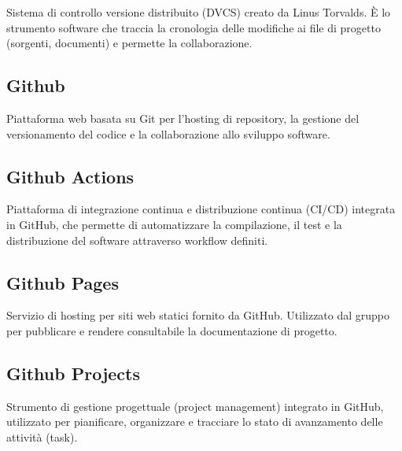 \documentclass[a4paper, 11pt, oneside]{scrartcl} %
\begin{document}

Sistema di controllo versione distribuito (DVCS) creato da Linus Torvalds.
È lo strumento software che traccia la cronologia delle modifiche ai file di progetto (sorgenti, documenti) e permette la collaborazione.

\vspace{0.5cm}

\subsection*{Github}


Piattaforma web basata su Git per l'hosting di repository, la gestione del versionamento del codice e la collaborazione allo sviluppo software.

\vspace{0.5cm}

\subsection*{Github Actions}
Piattaforma di integrazione continua e distribuzione continua (CI/CD) integrata in GitHub, che permette di automatizzare la compilazione, il test e la distribuzione del software attraverso workflow definiti.
\vspace{0.5cm}

\subsection*{Github Pages}


Servizio di hosting per siti web statici fornito da GitHub. Utilizzato dal gruppo per pubblicare e rendere consultabile la documentazione di progetto.

\vspace{0.5cm}

\subsection*{Github Projects}


Strumento di gestione progettuale (project management) integrato in GitHub, utilizzato per pianificare, organizzare e tracciare lo stato di avanzamento delle attività (task).
\end{document}

